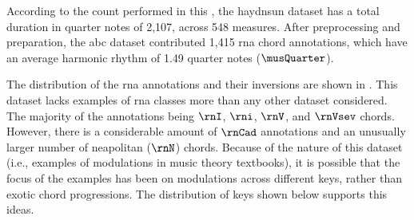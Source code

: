 
According to the count performed in this \thesisdiss{}, the
\gls{haydnsun} dataset has a total duration in quarter notes
of 2,107, across 548 measures. After preprocessing and
preparation, the \gls{abc} dataset contributed 1,415
\gls{rna} chord annotations, which have an average harmonic
rhythm of 1.49 quarter notes ($\musQuarter$).

The distribution of the \gls{rna} annotations and their
inversions are shown in . This
dataset lacks examples of \gls{rna} classes more than any
other dataset considered. The majority of the annotations
being $\rnI$, $\rni$, $\rnV$, and $\rnVsev$ chords. However,
there is a considerable amount of $\rnCad$ annotations and
an unusually larger number of \gls{neapolitan} ($\rnN$)
chords. Because of the nature of this dataset (i.e.,
examples of modulations in music theory textbooks), it is
possible that the focus of the examples has been on
modulations across different keys, rather than exotic chord
progressions. The distribution of keys shown below supports
this ideas.




